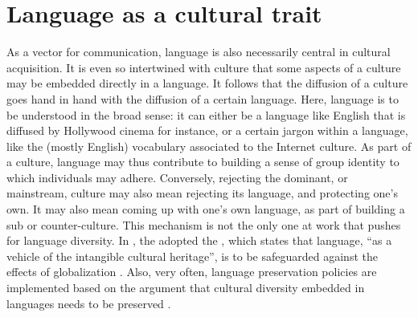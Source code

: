 \documentclass[../thesis.tex]{subfiles}
\begin{document}
\section{Language as a cultural trait}
As a vector for communication, language is also necessarily central in cultural
acquisition. It is even so intertwined with culture that some aspects of a culture may
be embedded directly in a language. It follows that the diffusion of a culture goes hand
in hand with the diffusion of a certain language. Here, language is to be understood in
the broad sense: it can either be a language like English that is diffused by Hollywood
cinema for instance, or a certain jargon within a language, like the (mostly English)
vocabulary associated to the Internet culture. As part of a culture, language may thus
contribute to building a sense of group identity to which individuals may adhere.
Conversely, rejecting the dominant, or mainstream, culture may also mean rejecting its
language, and protecting one's own. It may also mean coming up with one's own language,
as part of building a sub or counter-culture. This mechanism is not the only one at work
that pushes for language diversity. In \citeyear{UNESCOConventionSafeguarding2003}, the
\citeauthor{UNESCOConventionSafeguarding2003} adopted the
, which states that language, ``as a vehicle
of the intangible cultural heritage'', is to be safeguarded against the effects of
globalization \cite{UNESCOConventionSafeguarding2003}. Also, very often, language
preservation policies are implemented based on the argument that cultural diversity
embedded in languages needs to be preserved
\cite{CrystalLanguageDeath2000,GrenobleEndangeredLanguages1998,KraussWorldLanguages1992}.





\end{document}
